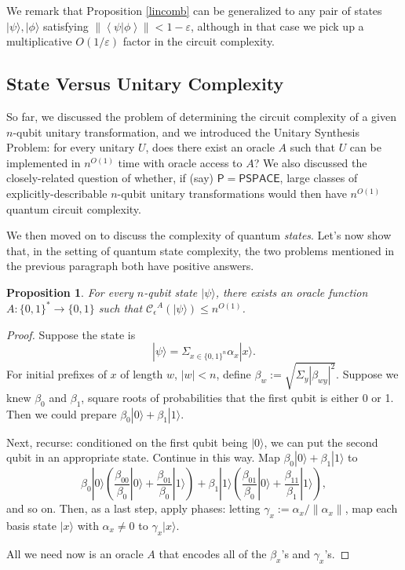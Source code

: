\documentclass[11pt]{report}
\theoremstyle{plain}
\newtheorem{proposition}[theorem]{Proposition}
\theoremstyle{definition}
\newcommand{\eps}{\varepsilon}
\renewcommand{\ket}[1]{|#1\rangle}
\newcommand{\sizee}{\ensuremath{\mathcal{C}_\epsilon}}
\begin{document}
We remark that Proposition \ref{lincomb} can be generalized to any pair of states $\ket{\psi},\ket{\phi}$ satisfying $\left\|\left\langle \psi | \phi \right\rangle \right\| < 1-\eps$, although in that case we pick up a multiplicative $O(1/\eps)$ factor in the circuit complexity.

\subsection{State Versus Unitary Complexity}

So far, we discussed the problem of determining the circuit complexity of a given $n$-qubit unitary transformation, and we introduced the Unitary Synthesis Problem: for every unitary $U$, does there exist an oracle $A$ such that $U$ can be implemented in $n^{O(1)}$ time with oracle access to $A$?  We also discussed the closely-related question of whether, if (say) $\mathsf{P}=\mathsf{PSPACE}$, large classes of explicitly-describable $n$-qubit unitary transformations would then have $n^{O(1)}$ quantum circuit complexity.

We then moved on to discuss the complexity of quantum {\em states}.  Let's now show that, in the setting of quantum state complexity, the two problems mentioned in the previous paragraph both have positive answers.

\begin{proposition}
\label{canmake}
For every $n$-qubit state $\ket{\psi}$, there exists an oracle function $A:\{0,1\}^*\longrightarrow \{0,1\}$ such that $\sizee^A(\ket{\psi}) \leq n^{O(1)}$.
\end{proposition}
 \begin{proof}
 Suppose the state is
 $$\ket{\psi} = \Sigma_{x \in \{0,1\}^n} \alpha_x \ket{x}.$$
 For initial prefixes of $x$ of length $w$,  $|w| <n$, define $\beta_w:= \sqrt{\Sigma_{y} |\beta_{w y }|^2}$.
Suppose we knew $\beta_0$  and $\beta_1$, square roots of probabilities that the first qubit is either 0 or 1. Then we could prepare  $\beta_0 \ket{0} + \beta_1 \ket{1}$.

  Next, recurse: conditioned on the first qubit being $\ket{0}$, we can put the second qubit in an appropriate state. Continue in this way.  Map $\beta_0 \ket{0}+\beta_1\ket{1}$ to
 \[
 \beta_0 \ket{0} \left(\frac{\beta_{00}}{\beta_0} \ket{0} + \frac{\beta_{01}}{\beta_0} \ket{1}\right)+ \beta_1 \ket{1} \left(\frac{\beta_{01}}{\beta_0} \ket{0} + \frac{\beta_{11}}{\beta_1} \ket{1}\right),
 \]
and so on.  Then, as a last step, apply phases: letting $\gamma_x := \alpha_x / \| \alpha_x \|$, map each basis state $\ket{x}$ with $\alpha_x \neq 0$ to $\gamma_x \ket{x}$.

 All we need now is an oracle $A$ that encodes all of the $\beta_x$'s and $\gamma_x$'s.
  \end{proof}
\end{document}

